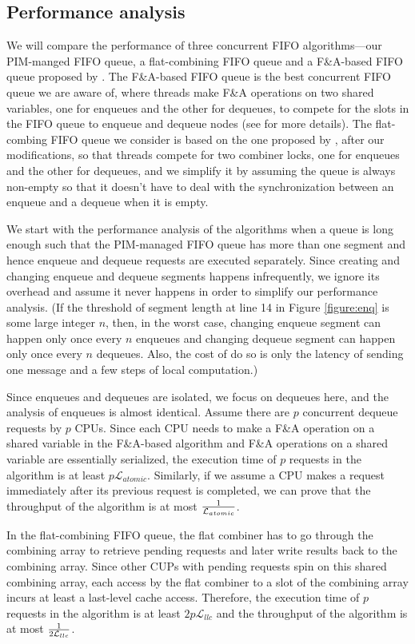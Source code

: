 \documentclass[11pt, letterpaper]{article}   	%
\newcommand{\latllc} {\mathcal{L}_{llc}}
\newcommand{\latato} {\mathcal{L}_{atomic}}
\begin{document}
\subsection{Performance analysis}
We will compare the performance of three concurrent FIFO algorithms---our PIM-manged FIFO queue, 
a flat-combining FIFO queue and a F\&A-based FIFO queue proposed by \cite{Morrison13}. 
The F\&A-based FIFO queue is the best concurrent FIFO queue we are aware of, 
where threads make F\&A operations on two shared variables, one for enqueues and the other for dequeues, 
to compete for the slots in the FIFO queue to enqueue and dequeue nodes (see \cite{Morrison13} for more details). 
The flat-combing FIFO queue we consider is based on the one proposed by \cite{Hendler10}, 
after our modifications, so that threads compete for two combiner locks, 
one for enqueues and the other for dequeues, and we simplify it by assuming the queue is always non-empty 
so that it doesn't have to deal with the synchronization between an enqueue and a dequeue when it is empty. 

We start with the performance analysis of the algorithms when a queue is long enough such that the PIM-managed 
FIFO queue has more than one segment and hence enqueue and dequeue requests are executed separately. 
Since creating and changing enqueue and dequeue segments happens infrequently, 
we ignore its overhead and assume it never happens in order to simplify our performance analysis.
(If the threshold of segment length at line 14 in Figure \ref{figure:enq} is some large integer $n$, 
then, in the worst case, changing enqueue segment can happen only once every $n$ enqueues and 
changing dequeue segment can happen only once every $n$ dequeues. 
Also, the cost of do so is only the latency of sending one message and a few steps of local computation.)

Since enqueues and dequeues are isolated, we focus on dequeues here,
and the analysis of enqueues is almost identical. 
Assume there are $p$ concurrent dequeue requests by $p$ CPUs. 
Since each CPU needs to make a F\&A operation on a shared variable in the F\&A-based algorithm and 
F\&A operations on a shared variable are essentially serialized, 
the execution time of $p$ requests in the algorithm is at least $p\latato$. 
Similarly, if we assume a CPU makes a request immediately after its previous request is completed, 
we can prove that the throughput of the algorithm is at most ${1 \over \latato}$.

In the flat-combining FIFO queue, the flat combiner has to go through the combining array to 
retrieve pending requests and later write results back to the combining array. 
Since other CUPs with pending requests spin on this shared combining array, 
each access by the flat combiner to a slot of the combining array incurs at least a last-level cache access. 
Therefore, the execution time of $p$ requests in the algorithm is at least $2p\latllc$ and 
the throughput of the algorithm is at most ${1 \over 2\latllc}$.
\end{document}
